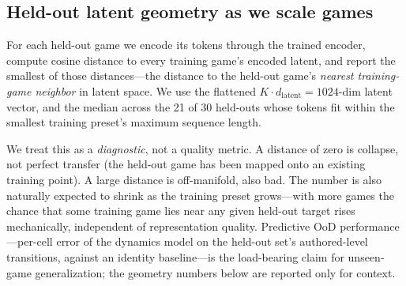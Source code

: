 \subsection{Held-out latent geometry as we scale games}
\label{app:scaling-curve}

For each held-out game we encode its tokens through the trained
encoder, compute cosine distance to every training game's encoded
latent, and report the smallest of those distances---the distance
to the held-out game's \emph{nearest training-game neighbor} in
latent space. We use the flattened
$K \cdot d_{\text{latent}} = 1024$-dim latent vector, and the median
across the 21 of 30 held-outs whose tokens fit within the smallest
training preset's maximum sequence length.

We treat this as a \emph{diagnostic}, not a quality metric. A
distance of zero is collapse, not perfect transfer (the held-out
game has been mapped onto an existing training point). A large
distance is off-manifold, also bad. The number is also naturally
expected to shrink as the training preset grows---with more
games the chance that some training game lies near any given
held-out target rises mechanically, independent of representation
quality. Predictive OoD performance---per-cell error of the dynamics model
on the held-out set's authored-level transitions, against an
identity baseline---is the load-bearing claim for unseen-game
generalization; the geometry numbers below are reported only for
context.

